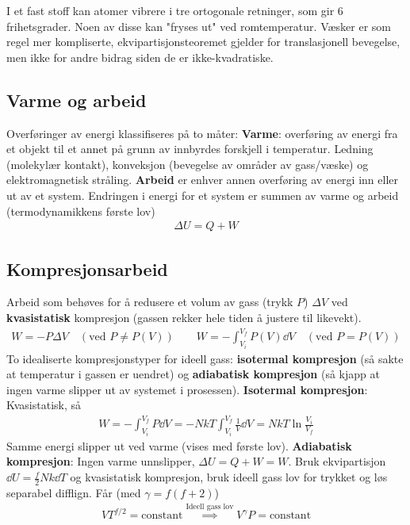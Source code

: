 \documentclass[12pt]{article}
\begin{document}
I et fast stoff kan atomer vibrere i tre ortogonale retninger, som gir 6 frihetsgrader.
Noen av disse kan "fryses ut" ved romtemperatur. Væsker er som regel mer kompliserte,
ekvipartisjonsteoremet gjelder for translasjonell bevegelse, men ikke for andre
bidrag siden de er ikke-kvadratiske.

\subsection{Varme og arbeid}
Overføringer av energi klassifiseres på to måter: \newline \noindent
\textbf{Varme}: overføring av energi fra et objekt til et annet på grunn av innbyrdes forskjell i temperatur. Ledning (molekylær
kontakt), konveksjon (bevegelse av områder av gass/væske) og elektromagnetisk stråling.\newline \noindent
\textbf{Arbeid} er enhver annen overføring av energi inn eller ut av et system.
\newline \noindent
Endringen i energi for et system er summen av varme og arbeid (termodynamikkens første lov)
\begin{align*}
  \Delta{U} = Q + W
\end{align*}
\subsection{Kompresjonsarbeid}
Arbeid som behøves for å redusere et volum av gass (trykk $P$) $\Delta V$ ved
\textbf{kvasistatisk} kompresjon (gassen rekker hele tiden å justere til likevekt).
\begin{align*}
  W = -P \Delta{V} \quad (\text{ved } P \neq P(V))\qquad W = - \int_{V_i}^{V_f} P(V) \dd V \quad (\text{ved } P = P(V))
\end{align*}
To idealiserte kompresjonstyper for ideell gass: \textbf{isotermal kompresjon}
(så sakte at temperatur i gassen er uendret) og \textbf{adiabatisk kompresjon}
(så kjapp at ingen varme slipper ut av systemet i prosessen). \newline \noindent
\textbf{Isotermal kompresjon}: Kvasistatisk, så
\begin{align*}
  W = -\int_{V_i}^{V_f} P \dd V = -NkT \int_{V_i}^{V_f} \frac{1}{V} \dd V = NkT \ln{\frac{V_i}{V_f}}
\end{align*}
Samme energi slipper ut ved varme (vises med første lov).\newline \noindent
\textbf{Adiabatisk kompresjon}: Ingen varme unnslipper, $\Delta U = Q + W = W$.
Bruk ekvipartisjon $\dd U = \frac{f}{2} N k \dd T$ og kvasistatisk kompresjon,
bruk ideell gass lov for trykket og løs separabel difflign. Får (med $\gamma = f(f+2)$)
\begin{align*}
  V T^{f/2} = \text{constant} \overset{\text{Ideell gass lov}}{\implies} V^\gamma P = \text{constant}
\end{align*}
\end{document}
